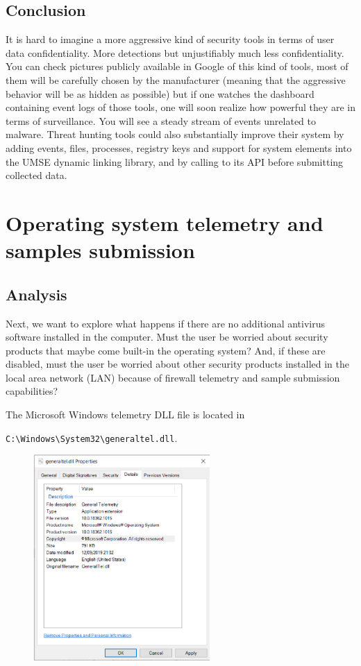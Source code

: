 \subsection{Conclusion}

It is hard to imagine a more aggressive kind of security tools in terms of
user data confidentiality. More detections but unjustifiably much less
confidentiality.  You can check pictures publicly available in Google of this
kind of tools, most of them will be carefully chosen by the manufacturer
(meaning that the aggressive behavior will be as hidden as possible) but if
one watches the dashboard containing event logs of those tools, one will soon
realize how powerful they are in terms of surveillance. You will see a steady
stream of events unrelated to malware.  Threat hunting tools could also
substantially improve their system by adding events, files, processes,
registry keys and support for system elements into the UMSE dynamic linking
library, and by calling to its API before submitting collected data.

\section{Operating system telemetry and samples submission}

\subsection{Analysis}

Next, we want to explore what happens if there are no additional antivirus
software installed in the computer. Must the user be worried about security
products that maybe come built-in the operating system? And, if these are
disabled, must the user be worried about other security products installed in
the local area network (LAN) because of firewall telemetry and sample
submission capabilities?

The Microsoft Windows telemetry DLL file is located in
\begin{tcolorbox}
  \verb|C:\Windows\System32\generaltel.dll|.
\end{tcolorbox}
\begin{figure}[h]
  \centering
  \includegraphics[width=0.6\textwidth]{./figures/WindowsTelemetry}
\end{figure}

